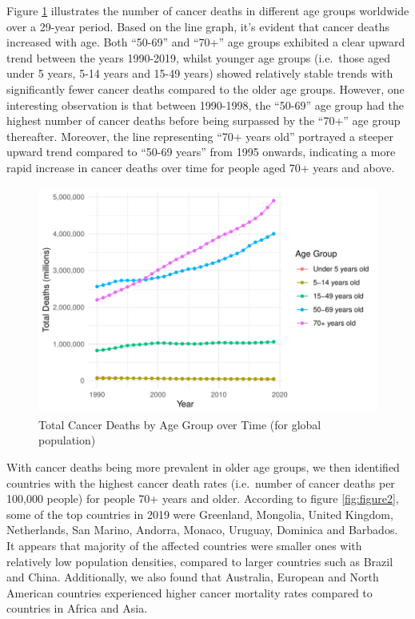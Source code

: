 \documentclass[11pt,a4paper,]{article}
\begin{document}
Figure \ref{fig:linegraph} illustrates the number of cancer deaths in different age groups worldwide over a 29-year period. Based on the line graph, it's evident that cancer deaths increased with age. Both ``50-69'' and ``70+'' age groups exhibited a clear upward trend between the years 1990-2019, whilst younger age groups (i.e.~those aged under 5 years, 5-14 years and 15-49 years) showed relatively stable trends with significantly fewer cancer deaths compared to the older age groups. However, one interesting observation is that between 1990-1998, the ``50-69'' age group had the highest number of cancer deaths before being surpassed by the ``70+'' age group thereafter. Moreover, the line representing ``70+ years old'' portrayed a steeper upward trend compared to ``50-69 years'' from 1995 onwards, indicating a more rapid increase in cancer deaths over time for people aged 70+ years and above.

\begin{figure}
\centering
\includegraphics{etc5513_assignment2_g1_t1_files/figure-latex/linegraph-1.pdf}
\caption{\label{fig:linegraph}Total Cancer Deaths by Age Group over Time (for global population)}
\end{figure}

With cancer deaths being more prevalent in older age groups, we then identified countries with the highest cancer death rates (i.e.~number of cancer deaths per 100,000 people) for people 70+ years and older. According to figure \ref{fig:figure2}, some of the top countries in 2019 were Greenland, Mongolia, United Kingdom, Netherlands, San Marino, Andorra, Monaco, Uruguay, Dominica and Barbados. It appears that majority of the affected countries were smaller ones with relatively low population densities, compared to larger countries such as Brazil and China. Additionally, we also found that Australia, European and North American countries experienced higher cancer mortality rates compared to countries in Africa and Asia.
\end{document}
